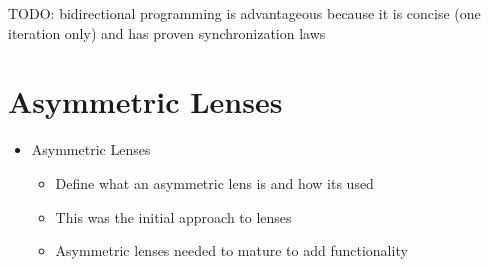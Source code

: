 TODO: bidirectional programming is advantageous because it is concise (one
iteration only) and has proven synchronization laws

\section{Asymmetric Lenses}
\label{sec:asymmetric-lenses}
\begin{itemize}
    \item Asymmetric Lenses
        \begin{itemize}
            \item Define what an asymmetric lens is and how its used
            \item This was the initial approach to lenses
            \item Asymmetric lenses needed to mature to add functionality
        \end{itemize}
\end{itemize}

